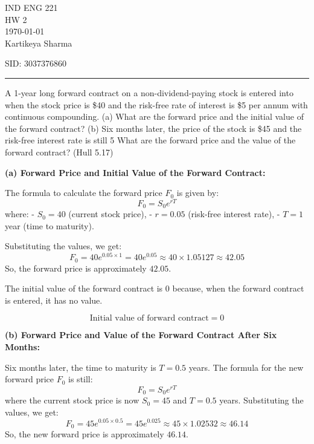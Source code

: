 \documentclass[12pt,letterpaper, onecolumn]{exam}
\begin{document}
\begingroup  
    \centering
    \LARGE IND ENG 221\\
    \LARGE HW 2\\[0.5em]
    \large \today\\[0.5em]
    \large Kartikeya Sharma\par
    \large SID: 3037376860\par
\endgroup
\rule{\textwidth}{0.4pt}
\pointsdroppedatright   %
\printanswers
\renewcommand{\solutiontitle}{\noindent\textbf{Ans:}\enspace}   %

\begin{questions}

    \question A 1-year long forward contract on a non-dividend-paying stock is entered into when
the stock price is \$40 and the risk-free rate of interest is \$5 per annum with continuous
compounding.
(a) What are the forward price and the initial value of the forward contract?
(b) Six months later, the price of the stock is \$45 and the risk-free interest rate is still 5%
What are the forward price and the value of the forward contract? (Hull 5.17)
    
    \begin{solution}

\textbf{(a) Forward Price and Initial Value of the Forward Contract:}

The formula to calculate the forward price \( F_0 \) is given by:
\[
F_0 = S_0 e^{rT}
\]
where:
- \( S_0 = 40 \) (current stock price),
- \( r = 0.05 \) (risk-free interest rate),
- \( T = 1 \) year (time to maturity).

Substituting the values, we get:
\[
F_0 = 40 e^{0.05 \times 1} = 40 e^{0.05} \approx 40 \times 1.05127 \approx 42.05
\]
So, the forward price is approximately \( 42.05 \).

The initial value of the forward contract is 0 because, when the forward contract is entered, it has no value.

\[
\text{Initial value of forward contract} = 0
\]

\textbf{(b) Forward Price and Value of the Forward Contract After Six Months:}

Six months later, the time to maturity is \( T = 0.5 \) years. The formula for the new forward price \( F_0 \) is still:
\[
F_0 = S_0 e^{rT}
\]
where the current stock price is now \( S_0 = 45 \) and \( T = 0.5 \) years. Substituting the values, we get:
\[
F_0 = 45 e^{0.05 \times 0.5} = 45 e^{0.025} \approx 45 \times 1.02532 \approx 46.14
\]
So, the new forward price is approximately \( 46.14 \).


\end{solution}
\end{questions}
\end{document}
